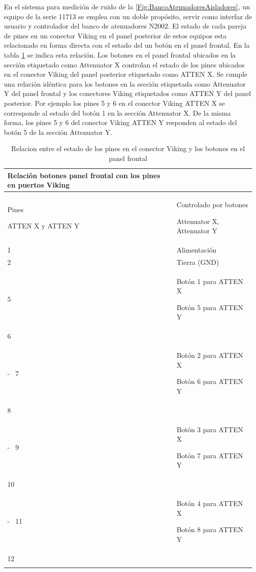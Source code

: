 En el sistema para medición de ruido de la \ref{Fig:BancoAtenuadoresAisladores}, un equipo de la serie 11713 se emplea con un doble propósito, servir como interfaz de usuario y controlador del banco de atenuadores N2002. El estado de cada pareja de pines en un conector Viking en el panel posterior de estos equipos esta relacionado en forma directa con el estado del un botón en el panel frontal. En la tabla \ref{Tab:PinesBotones11713} se indica esta relación. Los botones en el panel frontal ubicados en	la sección etiquetado como Attenuator X controlan el estado de los pines ubicados en el conector Viking del panel posterior etiquetado como ATTEN X. Se cumple una relación idéntica para los botones en la sección etiquetada como Attenuator Y del panel frontal y los conectores Viking etiquetados como ATTEN Y del panel posterior. Por ejemplo los pines 5 y 6 en el conector Viking ATTEN X se corresponde al estado del botón 1 en la sección Attenuator X. De la misma forma, los pines 5 y 6 del conector Viking ATTEN Y responden al estado del botón 5 de la sección Attenuator Y.

\begin{table}			
	\raggedright
	\caption{Relacion entre el estado de los pines en el conector Viking y los botones en el panel frontal}
	\label{Tab:PinesBotones11713}
	\begin{tabular}{|m{2.34cm}|m{5.448cm}|}									
		Relación botones panel frontal con los pines en puertos Viking	\\
		\hline
		{ Pines\par} ATTEN X y ATTEN Y & { Controlado por botones \par}	\arraybslash Attenuator X, Attenuator Y	\\
		\hline
		1 & \arraybslash Alimentación \\
		\hline
		2 & \arraybslash Tierra (GND)	\\
		\hline
		5 & { Botón 1 para ATTEN X \par} \arraybslash Botón 5 para ATTEN Y	\\
		\hline
		\multicolumn{1}{|m{2.34cm}}{ 6} & \\	
		\hhline
		{-~} 7 & { Botón 2 para ATTEN X\par} \arraybslash Botón 6 para ATTEN Y	\\
		\hline
		\multicolumn{1}{|m{2.34cm}}{ 8} &	\\
		\hhline
		{-~} 9 & { Botón 3 para ATTEN X \par} \arraybslash Botón 7 para ATTEN Y	\\	
		\hline
		\multicolumn{1}{|m{2.34cm}}{ 10} &	\\	
		\hhline
		{-~}  11 & { Botón 4 para ATTEN X \par}	\arraybslash Botón 8 para ATTEN Y	\\
		\hline
		\multicolumn{1}{|m{2.34cm}}{ 12} &	\\
		\hhline{-~}
	\end{tabular}			
\end{table}	

